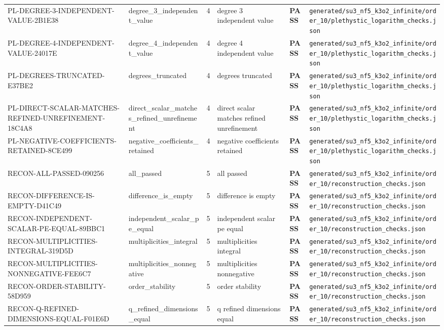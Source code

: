 \documentclass[11pt]{article}
\newcommand{\Pass}{\textcolor{green!50!black}{\textbf{PASS}}}
\newcommand{\RawPath}[1]{\texttt{#1}}
\begin{document}
\begin{longtable}{p{3cm}p{2.5cm}r p{3cm}l p{2cm}}
PL-DEGREE-3-INDEPENDENT-VALUE-2B1E38 & degree\_3\_independent\_value & 4 & degree 3 independent value & \Pass & \RawPath{generated/su3\_nf5\_k3o2\_infinite/order\_10/plethystic\_logarithm\_checks.json}\\
PL-DEGREE-4-INDEPENDENT-VALUE-24017E & degree\_4\_independent\_value & 4 & degree 4 independent value & \Pass & \RawPath{generated/su3\_nf5\_k3o2\_infinite/order\_10/plethystic\_logarithm\_checks.json}\\
PL-DEGREES-TRUNCATED-E37BE2 & degrees\_truncated & 4 & degrees truncated & \Pass & \RawPath{generated/su3\_nf5\_k3o2\_infinite/order\_10/plethystic\_logarithm\_checks.json}\\
PL-DIRECT-SCALAR-MATCHES-REFINED-UNREFINEMENT-18C4A8 & direct\_scalar\_matches\_refined\_unrefinement & 4 & direct scalar matches refined unrefinement & \Pass & \RawPath{generated/su3\_nf5\_k3o2\_infinite/order\_10/plethystic\_logarithm\_checks.json}\\
PL-NEGATIVE-COEFFICIENTS-RETAINED-8CE499 & negative\_coefficients\_retained & 4 & negative coefficients retained & \Pass & \RawPath{generated/su3\_nf5\_k3o2\_infinite/order\_10/plethystic\_logarithm\_checks.json}\\
RECON-ALL-PASSED-090256 & all\_passed & 5 & all passed & \Pass & \RawPath{generated/su3\_nf5\_k3o2\_infinite/order\_10/reconstruction\_checks.json}\\
RECON-DIFFERENCE-IS-EMPTY-D41C49 & difference\_is\_empty & 5 & difference is empty & \Pass & \RawPath{generated/su3\_nf5\_k3o2\_infinite/order\_10/reconstruction\_checks.json}\\
RECON-INDEPENDENT-SCALAR-PE-EQUAL-89BBC1 & independent\_scalar\_pe\_equal & 5 & independent scalar pe equal & \Pass & \RawPath{generated/su3\_nf5\_k3o2\_infinite/order\_10/reconstruction\_checks.json}\\
RECON-MULTIPLICITIES-INTEGRAL-319D5D & multiplicities\_integral & 5 & multiplicities integral & \Pass & \RawPath{generated/su3\_nf5\_k3o2\_infinite/order\_10/reconstruction\_checks.json}\\
RECON-MULTIPLICITIES-NONNEGATIVE-FEE6C7 & multiplicities\_nonnegative & 5 & multiplicities nonnegative & \Pass & \RawPath{generated/su3\_nf5\_k3o2\_infinite/order\_10/reconstruction\_checks.json}\\
RECON-ORDER-STABILITY-58D959 & order\_stability & 5 & order stability & \Pass & \RawPath{generated/su3\_nf5\_k3o2\_infinite/order\_10/reconstruction\_checks.json}\\
RECON-Q-REFINED-DIMENSIONS-EQUAL-F01E6D & q\_refined\_dimensions\_equal & 5 & q refined dimensions equal & \Pass & \RawPath{generated/su3\_nf5\_k3o2\_infinite/order\_10/reconstruction\_checks.json}\\

\end{longtable}
\end{document}
